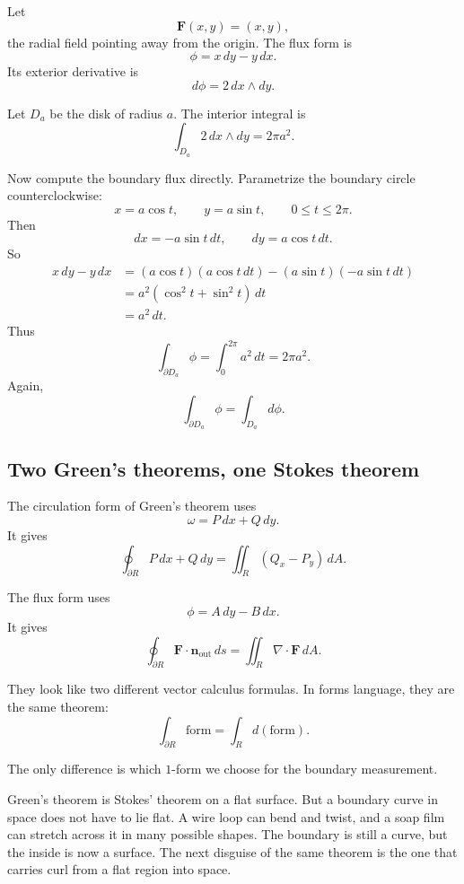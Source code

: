 \begin{example}
Let
\[
    \mathbf F(x,y)=(x,y),
\]
the radial field pointing away from the origin.  The flux form is
\[
    \phi=x\,dy-y\,dx.
\]
Its exterior derivative is
\[
    d\phi=2\,dx\wedge dy.
\]

Let \(D_a\) be the disk of radius \(a\).  The interior integral is
\[
    \int_{D_a}2\,dx\wedge dy=2\pi a^2.
\]

Now compute the boundary flux directly.  Parametrize the boundary circle
counterclockwise:
\[
    x=a\cos t,
    \qquad
    y=a\sin t,
    \qquad
    0\le t\le2\pi.
\]
Then
\[
    dx=-a\sin t\,dt,
    \qquad
    dy=a\cos t\,dt.
\]
So
\[
\begin{aligned}
    x\,dy-y\,dx
    &=
    (a\cos t)(a\cos t\,dt)
    -
    (a\sin t)(-a\sin t\,dt)\\
    &=
    a^2(\cos^2t+\sin^2t)\,dt\\
    &=
    a^2\,dt.
\end{aligned}
\]
Thus
\[
    \int_{\partial D_a}\phi
    =
    \int_0^{2\pi}a^2\,dt
    =
    2\pi a^2.
\]
Again,
\[
\boxed{
    \int_{\partial D_a}\phi=\int_{D_a}d\phi.
}
\]
\end{example}

\subsection{Two Green's theorems, one Stokes theorem}

The circulation form of Green's theorem uses
\[
    \omega=P\,dx+Q\,dy.
\]
It gives
\[
\boxed{
    \oint_{\partial R}P\,dx+Q\,dy
    =
    \iint_R (Q_x-P_y)\,dA.
}
\]

The flux form uses
\[
    \phi=A\,dy-B\,dx.
\]
It gives
\[
\boxed{
    \oint_{\partial R}\mathbf F\cdot\mathbf n_{\text{out}}\,ds
    =
    \iint_R \nabla\cdot\mathbf F\,dA.
}
\]

They look like two different vector calculus formulas.  In forms language, they are the
same theorem:
\[
\boxed{
    \int_{\partial R}\text{form}=\int_R d(\text{form}).
}
\]

The only difference is which \(1\)-form we choose for the boundary measurement.

Green's theorem is Stokes' theorem on a flat surface.  But a boundary curve in space
does not have to lie flat.  A wire loop can bend and twist, and a soap film can stretch
across it in many possible shapes.  The boundary is still a curve, but the inside is now
a surface.  The next disguise of the same theorem is the one that carries curl from a
flat region into space.

